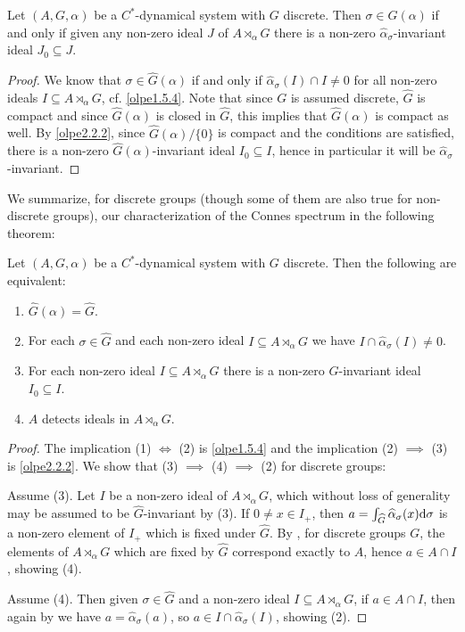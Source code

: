 \begin{proposition}
	Let $(A,G,\alpha)$ be a $C^*$-dynamical system with $G$ discrete. Then $\sigma \in \hat G(\alpha)$ if and only if given any non-zero ideal $J$ of $A \rtimes_\alpha G$ there is a non-zero $\hat \alpha_\sigma$-invariant ideal $J_0 \subseteq J$.
	\label{olpe2.2.4}
\end{proposition}
\begin{proof}
	We know that $\sigma \in \hat G(\alpha)$ if and only if $\hat \alpha_\sigma(I) \cap I \neq 0$ for all non-zero ideals $I\subseteq A \rtimes_\alpha G$, cf. \cref{olpe1.5.4}. Note that since $G$ is assumed discrete, $\hat G$ is compact and since $\hat G(\alpha)$ is closed in $\hat G$, this implies that $\hat G(\alpha)$ is compact as well. By \cref{olpe2.2.2}, since $\hat G(\alpha) /\{0\}$ is compact and the conditions are satisfied, there is a non-zero $\hat G(\alpha)$-invariant ideal $I_0\subseteq I$, hence in particular it will be $\hat \alpha_\sigma$-invariant. 
\end{proof}
We summarize, for discrete groups (though some of them are also true for non-discrete groups), our characterization of the Connes spectrum in the following theorem:
\begin{theorem}
	Let $(A,G,\alpha)$ be a $C^*$-dynamical system with $G$ discrete. Then the following are equivalent:
	\begin{enumerate}[nosep]
		\item $\hat G(\alpha) = \hat G$.
		\item For each $\sigma \in \hat G$ and each non-zero ideal $I \subseteq A \rtimes_\alpha G$ we have $I \cap \hat \alpha_\sigma(I) \neq 0$.
		\item For each non-zero ideal $I \subseteq A \rtimes_\alpha G$ there is a non-zero $\hat G$-invariant ideal $I_0 \subseteq I$.
		\item $A$ detects ideals in $A \rtimes_\alpha G$.
	\end{enumerate}
	\label{olpe2.2.5}
\end{theorem}
\begin{proof}
	The implication (1) $\iff$ (2) is \cref{olpe1.5.4} and the implication (2) $\implies$ (3) is \cref{olpe2.2.2}. We show that (3) $\implies$ (4) $\implies$ (2) for discrete groups:

	Assume (3). Let $I$ be a non-zero ideal of $A \rtimes_\alpha G$, which without loss of generality may be assumed to be $\hat G$-invariant by (3). If $0 \neq x \in I_+$, then $a = \int_{\widehat{G}} \widehat{\alpha}_{\sigma}(x) \mathrm{d} \sigma$ is a non-zero element of $I_+$ which is fixed under $\hat G$. By \cite[lemma 3.2]{landstad1979towards}, for discrete groups $G$, the elements of $A \rtimes_\alpha G$ which are fixed by $\hat G$ correspond exactly to $A$, hence $a \in A \cap I$, showing (4).

	Assume (4). Then given $\sigma \in \hat G$ and a non-zero ideal $I \subseteq A \rtimes_\alpha G$, if $a \in A \cap I$, then again by \cite[lemma 3.2]{landstad1979towards} we have $a = \hat \alpha_\sigma(a)$, so $a \in I \cap \hat \alpha_\sigma(I)$, showing (2).
\end{proof}

